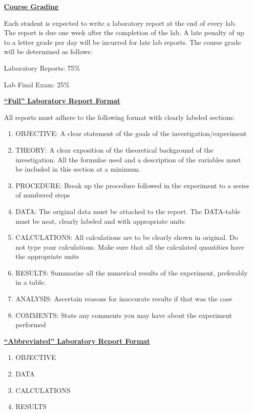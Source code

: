 \documentclass[12pt]{article}
\begin{document}
\underline{\textbf{Course Grading}} \par
Each student is expected to write a laboratory report at the end of every lab.
The report is due one week after the completion of the lab.
A late penalty of up to a letter grade per day will be incurred for late lab reports.
The course grade will be determined as follows: \par
\hfill \break
Laboratory Reports: 75\% \par
Lab Final Exam: 25\%
\hfill \break

\underline{\textbf{``Full'' Laboratory Report Format}} \par
All reports must adhere to the following format with clearly labeled sections:
\begin{enumerate}
\item OBJECTIVE: A clear statement of the goals of the investigation/experiment
\item THEORY: A clear exposition of the theoretical background of the investigation. All the formulae used and a description of the variables must be included in this section at a minimum.
\item PROCEDURE: Break up the procedure followed in the experiment to a series of numbered steps
\item DATA: The original data must be attached to the report. The DATA-table must be neat, clearly labeled and with appropriate units
\item CALCULATIONS: All calculations are to be clearly shown in original. Do not type your calculations. Make sure that all the calculated quantities have the appropriate units
\item RESULTS: Summarize all the numerical results of the experiment, preferably in a table.
\item ANALYSIS: Ascertain reasons for inaccurate results if that was the case
\item COMMENTS: State any comments you may have about the experiment performed
\end{enumerate}

\underline{\textbf{``Abbreviated'' Laboratory Report Format}} \par
\begin{enumerate}
\item OBJECTIVE
\item DATA
\item CALCULATIONS
\item RESULTS
\end{enumerate}
\end{document}

